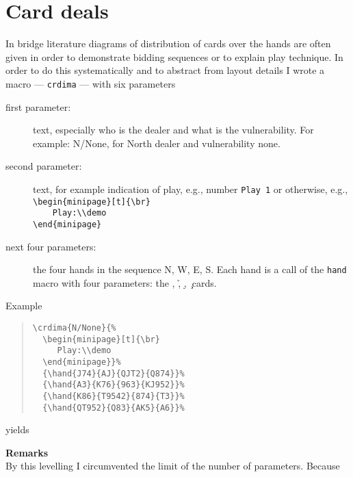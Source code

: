 \section{Card deals}
In bridge literature diagrams of distribution of cards over
the hands are often given in order to demonstrate bidding
sequences or to explain play technique.
In order to do this systematically and to abstract from layout details
I wrote a macro --- \verb=crdima= --- with six parameters
\begin{description}
\item[first parameter:] text, especially who is the dealer and what is the
     vulnerability. For example: N/None, for North dealer and
     vulnerability none.
\item[second parameter:] text, for example indication of play,
 e.g., number \verb=Play 1= or otherwise, e.g., \\
 \verb=\begin{minipage}[t]{\br}=\\
 \verb=    Play:\\demo=\\
 \verb=\end{minipage}=
\item[next four parameters:] the four hands in the sequence N, W, E, S.
     Each hand is a call of the \verb=hand= macro
with four parameters: the \s, \h, \d, \c\ cards.
\end{description}
Example
\begin{quote}
\begin{verbatim}
\crdima{N/None}{%
  \begin{minipage}[t]{\br}
     Play:\\demo
  \end{minipage}}%
  {\hand{J74}{AJ}{QJT2}{Q874}}%
  {\hand{A3}{K76}{963}{KJ952}}%
  {\hand{K86}{T9542}{874}{T3}}%
  {\hand{QT952}{Q83}{AK5}{A6}}%
\end{verbatim}
\end{quote}
yields
\begin{quote}
%
  {}%
  {}%
  {}%
  {}%
\end{quote}
%
{\bf Remarks}\\
By this levelling I circumvented the limit of the
number of parameters. Because
